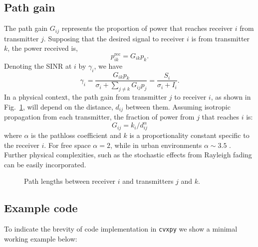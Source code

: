 \documentclass[twocolumn,secnumarabic,amssymb, nobibnotes, aps, prl,superscriptaddress]{revtex4-1}
\begin{document}
\subsection{Path gain}
\noindent The path gain $G_{ij}$ represents the proportion of power that reaches receiver $i$ from transmitter $j$. Supposing that the desired signal to receiver $i$ is from transmitter $k$, the power received is,
\begin{equation}
p_{ik}^{\text{rec}} = G_{ik}p_k.
\end{equation}
Denoting the SINR at $i$ by $\gamma_i$, we have
\begin{equation}
\gamma_i = \frac{G_{ik}p_k}{\sigma_i+\sum_{j\neq k}G_{ij}p_j}
=\frac{S_i}{\sigma_i+I_i}.
\end{equation}
In a physical context, the path gain from transmitter $j$ to receiver $i$, as shown in Fig.~\ref{fig:pathgain}, will depend on the distance, $d_{ij}$ between them. Assuming isotropic propagation from each transmitter, the fraction of power from $j$ that reaches $i$ is:
\begin{equation}
G_{ij} = k_i/d_{ij}^\alpha
\end{equation}
where $\alpha$ is the pathloss coefficient and $k$ is a proportionality constant specific to the receiver $i$.  For free space $\alpha = 2$, while in urban environments $\alpha \sim 3.5$ \cite{hata1980}. Further physical complexities, such as the stochastic effects from Rayleigh fading can be easily incorporated.

\begin{figure}[H]
\centering
{}
\caption{\label{fig:pathgain}Path lengths between receiver $i$ and transmitters $j$ and $k$.}
\end{figure}

\subsection{Example code}
\noindent To indicate the brevity of code implementation in \texttt{cvxpy} we show a minimal working example below: 
\end{document}
